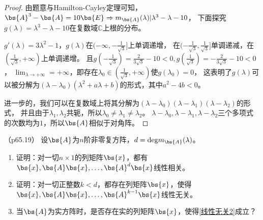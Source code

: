 \documentclass[12pt, a4paper, oneside, UTF8]{ctexbook}
\begin{document}
\begin{proof}
    由题意与Hamilton-Cayley定理可知，$\bs{A}^3-\bs{A}=10\bs{E} \Rightarrow m_{\bs{A}}(\lambda)|\lambda^3-\lambda-10$，
    下面探究$g(\lambda)=\lambda^3-\lambda-10$在复数域$\mathbb{C}$上根的分布。

    $g'(\lambda)=3\lambda^2-1$，$g(\lambda)$在$(-\infty,-\frac{1}{\sqrt{3}}]$上单调递增，
    在$(-\frac{1}{\sqrt{3}},\frac{1}{\sqrt{3}}]$单调递减，在$(\frac{1}{\sqrt{3}},+\infty)$上单调递增。
    且$g(-\frac{1}{\sqrt{3}})=\frac{2}{3\sqrt{3}}-10<0,g(\frac{1}{\sqrt{3}})=-\frac{2}{3\sqrt{3}}-10<0$，
    $\lim_{\lambda \to +\infty}=+\infty$，即存在$\lambda_0 \in (\frac{1}{\sqrt{3}},+\infty)$使$g(\lambda_0)=0$，
    这表明了$g(\lambda)$可以被分解为$(\lambda-\lambda_0)(\lambda^2+a\lambda+b)$的形式，其中$a^2-4b <0$。
    
    进一步的，我们可以在复数域上将其分解为$(\lambda-\lambda_0)(\lambda-\lambda_1)(\lambda-\lambda_2)$的形式，
    并且由于$\lambda_1,\lambda_2$共轭，所以$\lambda_0\neq\lambda_1 \neq \lambda_2$。
    $\lambda-\lambda_0,\lambda-\lambda_1,\lambda-\lambda_2$三个多项式的次数均为$1$，所以$\bs{A}$相似于对角阵。
\end{proof}

\begin{question}（p65.19）
    设$\bs{A}$为$n$阶非零复方阵，$d=\mathrm{deg}m_{\bs{A}}(\lambda)$。
    \begin{enumerate}[label=(\arabic*)]
        \item 证明：对一切$n \times 1$的列矩阵$\bs{x}$，都有$\bs{x},\bs{A}\bs{x},\ldots,\bs{A}^{d}\bs{x}$线性相关。
        \item 证明：对一切正整数$k<d$，都存在列矩阵$\bs{x}$，使得$\bs{x},\bs{A}\bs{x},\ldots,\bs{A}^{k-1}\bs{x}$线性无关。\label{线性无关2}
        \item 当$\bs{A}$为实方阵时，是否存在实的列矩阵$\bs{x}$，使得\ref{线性无关2}成立？
    \end{enumerate}
\end{question}
\end{document}
